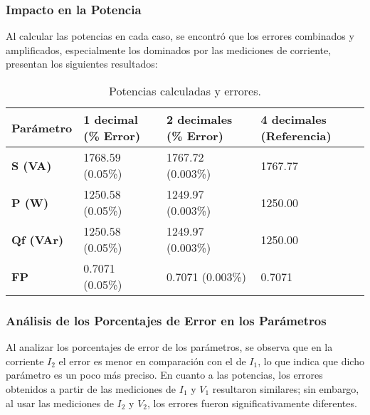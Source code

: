 \documentclass[conference]{IEEEtran}
\theoremstyle{mytheoremstyle}
\theoremstyle{mytheoremstyle}
\theoremstyle{myproblemstyle}
\begin{document}
        \subsubsection{Impacto en la Potencia}
        Al calcular las potencias en cada caso, se encontró que los errores combinados y amplificados, especialmente los dominados por las mediciones de corriente, presentan los siguientes resultados:

        \begin{table}[H]
        \centering
        \caption{Potencias calculadas y errores.}
        \label{tab:potencias_y_errores}
        \begin{tabular}{|l|l|l|l|}
        \hline
        \textbf{Parámetro} & \textbf{1 decimal (\% Error)} & \textbf{2 decimales (\% Error)} & \textbf{4 decimales (Referencia)} \\ \hline
        \textbf{S (VA)}    & 1768.59 (0.05\%)             & 1767.72 (0.003\%)              & 1767.77                          \\ \hline
        \textbf{P (W)}     & 1250.58 (0.05\%)             & 1249.97 (0.003\%)              & 1250.00                          \\ \hline
        \textbf{Qf (VAr)}  & 1250.58 (0.05\%)             & 1249.97 (0.003\%)              & 1250.00                          \\ \hline
        \textbf{FP}        & 0.7071 (0.05\%)              & 0.7071 (0.003\%)               & 0.7071                           \\ \hline
        \end{tabular}
        \end{table}


        \subsubsection{Análisis de los Porcentajes de Error en los Parámetros}
        Al analizar los porcentajes de error de los parámetros, se observa que en la corriente $I_2$ el error es menor en comparación con el de $I_1$, lo que indica que dicho parámetro es un poco más preciso. En cuanto a las potencias, los errores obtenidos a partir de las mediciones de $I_1$ y $V_1$ resultaron similares; sin embargo, al usar las mediciones de $I_2$ y $V_2$, los errores fueron significativamente diferentes.
        

        
\end{document}
